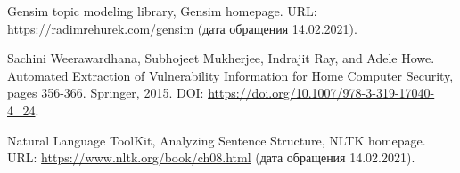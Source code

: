 \documentclass[../main]{subfiles}
\begin{document}
\begin{english}
\begin{biblenum}
     Gensim topic modeling library, Gensim homepage. URL: \url{https://radimrehurek.com/gensim} (дата обращения 14.02.2021).

     Sachini Weerawardhana, Subhojeet Mukherjee, Indrajit Ray, and Adele Howe. Automated Extraction of Vulnerability Information for Home Computer Security, pages 356-366. Springer, 2015. DOI: \url{https://doi.org/10.1007/978-3-319-17040-4_24}.

     Natural Language ToolKit, Analyzing Sentence Structure, NLTK home\-page. URL: \url{https://www.nltk.org/book/ch08.html} (дата обращения 14.02.2021).

\end{biblenum}
\end{english}
\end{document}
